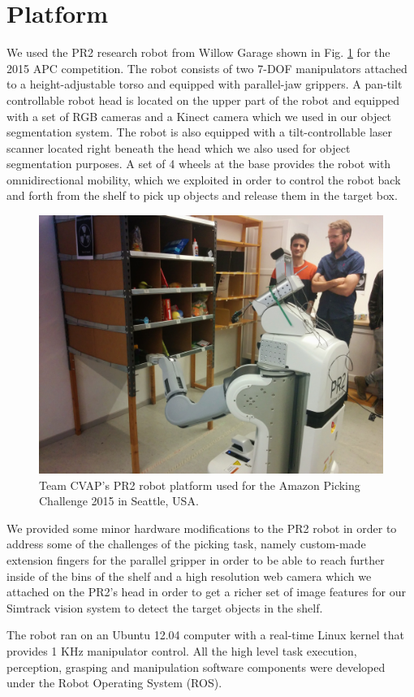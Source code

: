 \section{Platform}
\label{sec:platform}

We used the PR2 research robot from Willow Garage shown in Fig.
\ref{fig:PR2} for the 2015 APC competition. The robot consists of two
7-DOF manipulators attached to a height-adjustable torso and equipped with parallel-jaw
grippers. A pan-tilt controllable robot head is located on the upper part of the robot
and equipped with a set of RGB cameras and a Kinect camera which we used in
our object segmentation system. The robot is also
equipped with a tilt-controllable laser scanner located right beneath the head which we
also used for object segmentation purposes.
A set of 4 wheels at the base provides the robot with omnidirectional mobility, which we
exploited in order to control the robot back and forth from the shelf to pick up objects
and release them in the target box.


\begin{figure}[t]
\centering
\includegraphics[trim=15.0cm 4.0cm 6.0cm 0cm,clip=true,scale=0.07]{figures/pr2.jpg}
\caption{Team CVAP's PR2 robot platform used for the Amazon Picking Challenge 2015 in Seattle, USA.}\label{fig:PR2}
\end{figure}

We provided some minor hardware modifications to the PR2 robot in order to
address some of the challenges  of the picking task,
namely custom-made extension fingers for the parallel gripper in order
to be able to reach further inside of the bins of the shelf and a high resolution
web camera which we attached on the PR2's head in order to get
a richer set of image features for our Simtrack vision system to detect the target 
objects in the shelf.

The robot ran on an Ubuntu 12.04 computer with a real-time Linux kernel that provides
1 KHz manipulator control. All the high level task execution, perception, grasping and manipulation software components were developed under the Robot Operating System (ROS).
